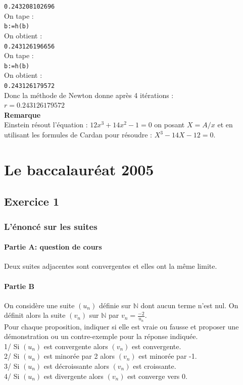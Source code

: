 \documentclass[a4paper,11pt]{book}
\begin{document}
{\tt 0.243208102696}\\
On tape :\\
{\tt b:=h(b)}\\
On obtient :\\
{\tt 0.243126196656}\\
On tape :\\
{\tt b:=h(b)}\\
On obtient :\\
{\tt 0.243126179572}\\
Donc la m\'ethode de Newton donne apr\`es 4 it\'erations :\\
$r=0.243126179572$\\
{\bf Remarque}\\
Einstein r\'esout l'\'equation :
$12x^3+14x^2-1=0$ on posant $X=A/x$ et en utilisant les formules de Cardan pour
r\'esoudre : $X^3-14X-12=0$.
\chapter{Le baccalaur\'eat 2005}
\section{Exercice 1}
\subsection{L'\'enonc\'e sur les suites}
\subsubsection{Partie A: question de cours}
Deux suites adjacentes sont convergentes et elles ont la m\^eme limite.
\subsubsection{Partie B}
On consid\`ere une suite $(u_n)$ d\'efinie sur $\mathbb N$ dont aucun terme 
n'est nul. On d\'efinit alors la suite $(v_n)$ sur $\mathbb N$ par
 $v_n=\frac{-2}{u_n}$.\\
Pour chaque proposition, indiquer si elle est vraie ou fausse et proposer 
une d\'emonstration ou un contre-exemple pour la r\'eponse indiqu\'ee.\\
1/ Si $(u_n)$ est convergente alors $(v_n)$ est convergente.\\
2/ Si $(u_n)$ est minor\'ee par 2 alors $(v_n)$ est minor\'ee par -1.\\
3/ Si $(u_n)$ est d\'ecroissante alors $(v_n)$ est croissante.\\
4/ Si $(u_n)$ est divergente alors $(v_n)$ est converge vers 0.\\
 
\end{document}
